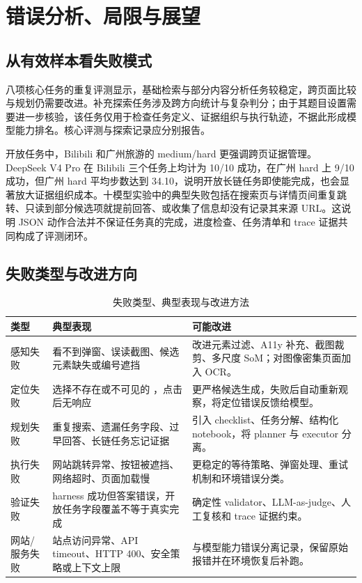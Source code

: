 
\section{错误分析、局限与展望}

\subsection{从有效样本看失败模式}

八项核心任务的重复评测显示，基础检索与部分内容分析任务较稳定，跨页面比较与规划仍需要改进。补充探索任务涉及跨方向统计与复杂判分；由于其题目设置需要进一步核验，该任务仅用于检查任务定义、证据组织与执行轨迹，不据此形成模型能力排名。核心评测与探索记录应分别报告。

开放任务中，Bilibili 和广州旅游的 medium/hard 更强调跨页证据管理。DeepSeek V4 Pro 在 Bilibili 三个任务上均计为 10/10 成功，在广州 hard 上 9/10 成功，但广州 hard 平均步数达到 34.10，说明开放长链任务即使能完成，也会显著放大证据组织成本。十模型实验中的典型失败包括在搜索页与详情页间重复跳转、只读到部分候选项就提前回答、或收集了信息却没有记录其来源 URL。这说明 JSON 动作合法并不保证任务真的完成，进度检查、任务清单和 trace 证据共同构成了评测闭环。

\subsection{失败类型与改进方向}

\begin{table}[H]
  \centering
  \caption{失败类型、典型表现与改进方法}
  \label{tab:failure-types}
  \small
  \begin{tabularx}{\textwidth}{p{}YY}
    \toprule
    类型 & 典型表现 & 可能改进 \\
    \midrule
    感知失败 & 看不到弹窗、误读截图、候选元素缺失或编号遮挡 & 改进元素过滤、A11y 补充、截图裁剪、多尺度 SoM；对图像密集页面加入 OCR。\\
    定位失败 & 选择不存在或不可见的 ，点击后无响应 & 更严格候选生成，失败后自动重新观察，将定位错误反馈给模型。\\
    规划失败 & 重复搜索、遗漏任务字段、过早回答、长链任务忘记证据 & 引入 checklist、任务分解、结构化 notebook，将 planner 与 executor 分离。\\
    执行失败 & 网站跳转异常、按钮被遮挡、网络超时、页面加载慢 & 更稳定的等待策略、弹窗处理、重试机制和环境错误分类。\\
    验证失败 & harness 成功但答案错误，开放任务字段覆盖不等于真实完成 & 确定性 validator、LLM-as-judge、人工复核和 trace 证据约束。\\
    网站/服务失败 & 站点访问异常、API timeout、HTTP 400、安全策略或上下文上限 & 与模型能力错误分离记录，保留原始报错并在环境恢复后补跑。\\
    \bottomrule
  \end{tabularx}
\end{table}

